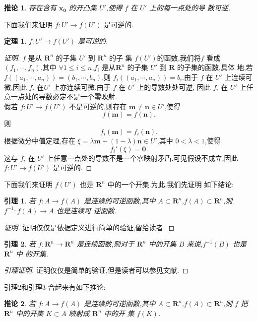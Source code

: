 \documentclass[twoside,11pt]{article}
\newtheorem{theorem}{定理}
\newtheorem{lemma}{引理}
\newtheorem{corollary}{推论}
\begin{document}
\begin{corollary}
  存在含有 $\mathbf{x_0}$ 的开凸集 $U'$,使得 $f$ 在 $U'$ 上的每一点处的导
  数可逆.
\end{corollary}
\bigskip
下面我们来证明 $f:U'\to f(U')$ 是可逆的.
\begin{theorem}
  $f:U'\to f(U')$ 是可逆的.
\end{theorem}
\begin{proof}[证明]
  $f$ 是从 $\mathbf{R}^n$ 的子集 $U'$ 到 $\mathbf{R}^n$ 的子
  集 $f(U')$的函数,我们将$f$ 看成 $(f_1,\cdots,f_n)$,其中 $\forall
  1\leq i\leq n$,$f_i$ 是从$\mathbf{R}^n$ 的子集 $U'$ 到 $\mathbf{R}$
  的子集的函数,具体
  地,若$f((a_1,\cdots,a_n))=(b_1,\cdots,b_n)$,则
  $f_i((a_1,\cdots,a_n))=b_i$.由于 $f$ 在 $U'$ 上连续可
  微,因此 $f_i$ 在$U'$ 上亦连续可微.由于 $f$ 在 $U'$ 上的导数处处可逆,
  因此 $f_i$ 在 $U'$ 上任意一点处的导数必定不是一个零映射.\\

假若 $f:U'\to f(U')$ 不是可逆的,则存在 $\mathbf{m}\neq \mathbf{n}\in
U'$,使得
$$
f(\mathbf{m})=f(\mathbf{n}).
$$
则
$$
f_i(\mathbf{m})=f_i(\mathbf{n}).
$$
根据微分中值定理,存在 $\xi=
\lambda\mathbf{m}+(1-\lambda)\mathbf{n}\in U'$,其中 $0<\lambda<1$,使得
$$
f_i'(\xi)=\mathbf{0}.
$$
这与 $f_i$ 在 $U'$ 上任意一点处的导数不是一个零映射矛盾.可见假设不成立,因此 $f:U'\to f(U')$ 是可逆的.
\end{proof}
\bigskip
下面我们来证明 $f(U')$ 也是 $\mathbf{R}^n$ 中的一个开集.为此,我们先证明
如下结论:
\begin{lemma}
  若 $f:A\to f(A)$ 是连续的可逆函数,其中 $A\subset \mathbf{R}^n$,$f(A)\subset
  \mathbf{R}^n$,则 $f^{-1}:f(A)\to A$ 也是连续可
  逆函数.
\end{lemma}
\begin{proof}[证明]
  证明仅仅是依据定义进行简单的验证,留给读者.
\end{proof}

\begin{lemma}
  若 $f:\mathbf{R}^{n}\to \mathbf{R}^{n}$ 是连续函数,则对于
  $\mathbf{R}^n$ 中的开集 $B$ 来说,$f^{-1}(B)$ 也是 $\mathbf{R}^n$ 中
  的开集.
\end{lemma}
\begin{proof}[引理证明]
  证明仅仅是简单的验证,但是读者可以参见文献\cite{spivak}.
\end{proof}
引理2和引理3 合起来有如下推论:
\begin{corollary}
  若 $f:A\to f(A)$ 是连续的可逆函数,其中 $A\subset \mathbf{R}^n$,$f(A)\subset
  \mathbf{R}^n$,则 $f$ 把 $\mathbf{R}^n$ 中的开集
  $K\subset A$ 映射成 $\mathbf{R}^n$ 中的开
  集 $f(K)$.
\end{corollary}
\end{document}
